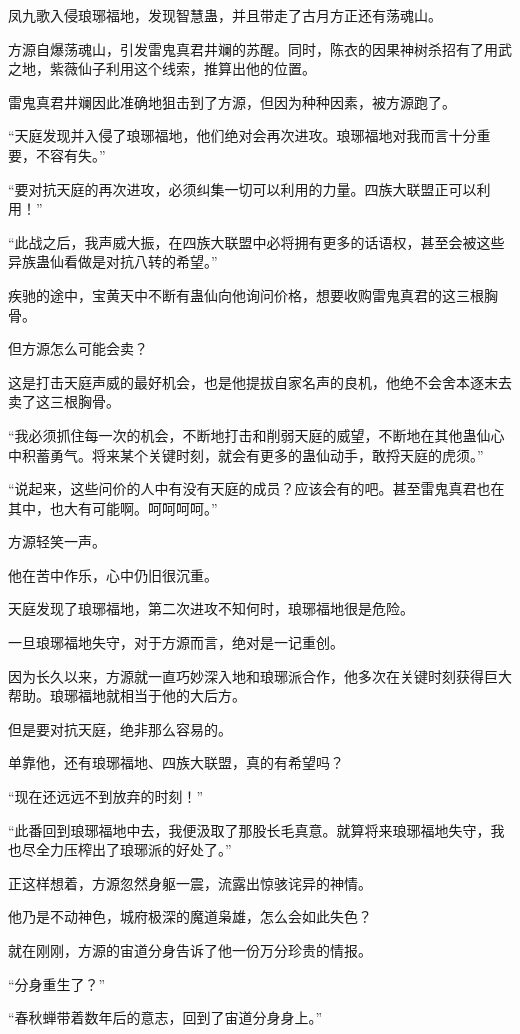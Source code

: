 \begin{this_body}
凤九歌入侵琅琊福地，发现智慧蛊，并且带走了古月方正还有荡魂山。

方源自爆荡魂山，引发雷鬼真君井斓的苏醒。同时，陈衣的因果神树杀招有了用武之地，紫薇仙子利用这个线索，推算出他的位置。

雷鬼真君井斓因此准确地狙击到了方源，但因为种种因素，被方源跑了。

“天庭发现并入侵了琅琊福地，他们绝对会再次进攻。琅琊福地对我而言十分重要，不容有失。”

“要对抗天庭的再次进攻，必须纠集一切可以利用的力量。四族大联盟正可以利用！”

“此战之后，我声威大振，在四族大联盟中必将拥有更多的话语权，甚至会被这些异族蛊仙看做是对抗八转的希望。”

疾驰的途中，宝黄天中不断有蛊仙向他询问价格，想要收购雷鬼真君的这三根胸骨。

但方源怎么可能会卖？

这是打击天庭声威的最好机会，也是他提拔自家名声的良机，他绝不会舍本逐末去卖了这三根胸骨。

“我必须抓住每一次的机会，不断地打击和削弱天庭的威望，不断地在其他蛊仙心中积蓄勇气。将来某个关键时刻，就会有更多的蛊仙动手，敢捋天庭的虎须。”

“说起来，这些问价的人中有没有天庭的成员？应该会有的吧。甚至雷鬼真君也在其中，也大有可能啊。呵呵呵呵。”

方源轻笑一声。

他在苦中作乐，心中仍旧很沉重。

天庭发现了琅琊福地，第二次进攻不知何时，琅琊福地很是危险。

一旦琅琊福地失守，对于方源而言，绝对是一记重创。

因为长久以来，方源就一直巧妙深入地和琅琊派合作，他多次在关键时刻获得巨大帮助。琅琊福地就相当于他的大后方。

但是要对抗天庭，绝非那么容易的。

单靠他，还有琅琊福地、四族大联盟，真的有希望吗？

“现在还远远不到放弃的时刻！”

“此番回到琅琊福地中去，我便汲取了那股长毛真意。就算将来琅琊福地失守，我也尽全力压榨出了琅琊派的好处了。”

正这样想着，方源忽然身躯一震，流露出惊骇诧异的神情。

他乃是不动神色，城府极深的魔道枭雄，怎么会如此失色？

就在刚刚，方源的宙道分身告诉了他一份万分珍贵的情报。

“分身重生了？”

“春秋蝉带着数年后的意志，回到了宙道分身身上。”


\end{this_body}
